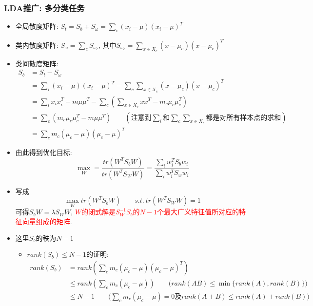 \documentclass[UTF8]{article}
\begin{document}
\subsubsection{LDA推广: 多分类任务}
\begin{itemize}
\item 全局散度矩阵: $S_t=S_b+S_{\omega}=\sum\limits_i(x_i-\mu)(x_i-\mu)^T$
\item 类内散度矩阵: $S_{\omega}=\sum\limits_cS_{\omega_c}$, 其中$S_{\omega_c}=\sum\limits_{x\in X_c}(x-\mu_c)(x-\mu_c)^T$
\item 类间散度矩阵: 
\begin{align*}
S_b&=S_t-S_{\omega}\\
&=\sum\limits_i(x_i-\mu)(x_i-\mu)^T-\sum\limits_c\sum\limits_{x\in X_c}(x-\mu_c)(x-\mu_c)^T\\
&=\sum\limits_ix_ix_i^T-m\mu\mu^T-\sum\limits_c(\sum\limits_{x\in X_c}xx^T-m_c\mu_c\mu_c^T)\\
&=\sum\limits_c(m_c\mu_c\mu_c^T-m\mu\mu^T)\qquad(\mbox{注意到$\sum\limits_i$和$\sum\limits_c\sum\limits_{x\in X_c}$都是对所有样本点的求和})\\
&=\sum\limits_cm_c(\mu_c-\mu)(\mu_c-\mu)^T
\end{align*}
\item 由此得到优化目标:
$$\max\limits_{W}=\frac{tr(W^TS_bW)}{tr(W^TS_WW)}=\frac{\sum_iw_i^TS_bw_i}{\sum_iw_i^TS_ww_i}$$
\item 写成$$\max\limits_{W}tr(W^TS_bW)\qquad s.t.\ tr(W^TS_WW)=1$$
可得$S_bW=\lambda S_WW$, \textcolor{red}{$W$的闭式解是$S_W^{-1}S_b$的$N-1$个最大广义特征值所对应的特征向量组成的矩阵}.
\item 这里$S_b$的秩为$N-1$
	\begin{itemize}
	\item $rank(S_b)\le N-1$的证明:
		\begin{align*}
		rank(S_b)&=rank(\sum\limits_cm_c(\mu_c-\mu)(\mu_c-\mu)^T)\\
		&\le rank(\sum\limits_cm_c(\mu_c-\mu))\qquad\mbox{($rank(AB)\le\min\{rank(A),rank(B)$\})}\\
		&\le N-1\qquad\mbox{($\sum\limits_cm_c(\mu_c-\mu)=0$及$rank(A+B)\le rank(A)+rank(B)$)}
		\end{align*}
	\end{itemize}
\end{itemize}
\end{document}

